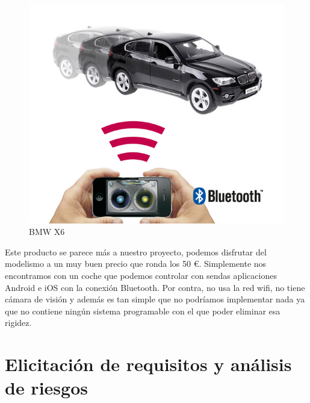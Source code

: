 \documentclass{pclass}
\begin{document}
\begin{figure}[H]
  \centering
    \includegraphics[width=1.2\textwidth]{img/producto2}
  \caption{BMW X6}
  \label{fig:BMWX6}
\end{figure}


Este producto se parece más a nuestro proyecto, podemos disfrutar del modelismo a un muy buen precio que ronda los 50 \euro. Simplemente nos encontramos con un coche que podemos controlar con sendas aplicaciones Android e iOS con la conexión Bluetooth. Por contra, no usa la red wifi, no tiene cámara de visión y además es tan simple que no podríamos implementar nada ya que no contiene ningún sistema programable con el que poder eliminar esa rigidez.


\clearpage
\section{Elicitación de requisitos y análisis de riesgos}
\end{document}
